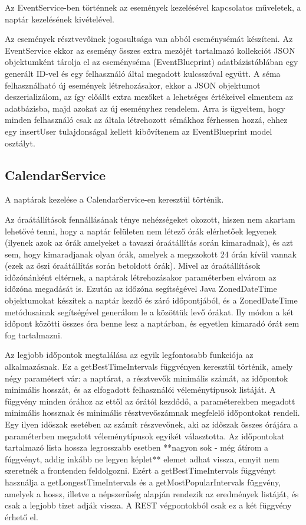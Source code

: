 \documentclass[a4paper,12pt]{report}
\theoremstyle{definition}
\theoremstyle{remark}
\begin{document}
Az EventService-ben történnek az események kezelésével kapcsolatos műveletek, a naptár kezelésének kivételével. 

Az események résztvevőinek jogosultsága van abból eseménysémát készíteni. Az EventService ekkor az esemény összes extra mezőjét tartalmazó kollekciót JSON objektumként tárolja el az eseményséma (EventBlueprint) adatbázistáblában egy generált ID-vel és egy felhasználó által megadott kulcsszóval együtt. A séma felhasználható új események létrehozásakor, ekkor a JSON objektumot deszerializálom, az így előállt extra mezőket a lehetséges értékeivel elmentem az adatbázisba, majd azokat az új eseményhez rendelem. Arra is ügyeltem, hogy minden felhasználó csak az általa létrehozott sémákhoz férhessen hozzá, ehhez egy insertUser tulajdonságal kellett kibővítenem az EventBlueprint model osztályt.

\subsection{CalendarService}

A naptárak kezelése a CalendarService-en keresztül történik.

Az óraátállítások fennállásának ténye nehézségeket okozott, hiszen nem akartam lehetővé tenni, hogy a naptár felületen nem létező órák elérhetőek legyenek (ilyenek azok az órák amelyeket a tavaszi óraátállítás során kimaradnak), és azt sem, hogy kimaradjanak olyan órák, amelyek a megszokott 24 órán kívül vannak (ezek az őszi óraátállítás során betoldott órák). Mivel az óraátállítások időzónánként eltérnek, a naptárak létrehozásakor paraméterben elvárom az időzóna megadását is. Ezután az időzóna segítségével Java ZonedDateTime objektumokat készítek a naptár kezdő és záró időpontjából, és a ZonedDateTime metódusainak segítségével generálom le a közöttük levő órákat. Ily módon a két időpont közötti összes óra benne lesz a naptárban, és egyetlen kimaradó órát sem fog tartalmazni.

Az legjobb időpontok megtalálása az egyik legfontosabb funkciója az alkalmazásnak. Ez a getBestTimeIntervals függvényen keresztül történik, amely négy paramétert vár: a naptárat, a résztvevők minimális számát, az időpontok minimális hosszát, és az elfogadott felhasználói véleménytípusok listáját. A függvény minden órához az ettől az órától kezdődő, a paraméterekben megadott minimális hossznak és minimális résztvevőszámnak megfelelő időpontokat rendeli. Egy ilyen időszak esetében az számít részvevőnek, aki az időszak összes órájára a paraméterben megadott véleménytípusok egyikét választotta. Az időpontokat tartalmazó lista hossza legrosszabb esetben **nagyon sok - még átírom a fúggvényt, addig inkább ne legyen képlet** elemet adhat vissza, ennyit nem szeretnék a frontenden feldolgozni. Ezért a getBestTimeIntervals függvényt használja a getLongestTimeIntervals és a getMostPopularIntervals függvény, amelyek a hossz, illetve a népszerűség alapján rendezik az eredmények listáját, és csak a legjobb tizet adják vissza. A REST végpontokból csak ez a két függvény érhető el.
\end{document}

